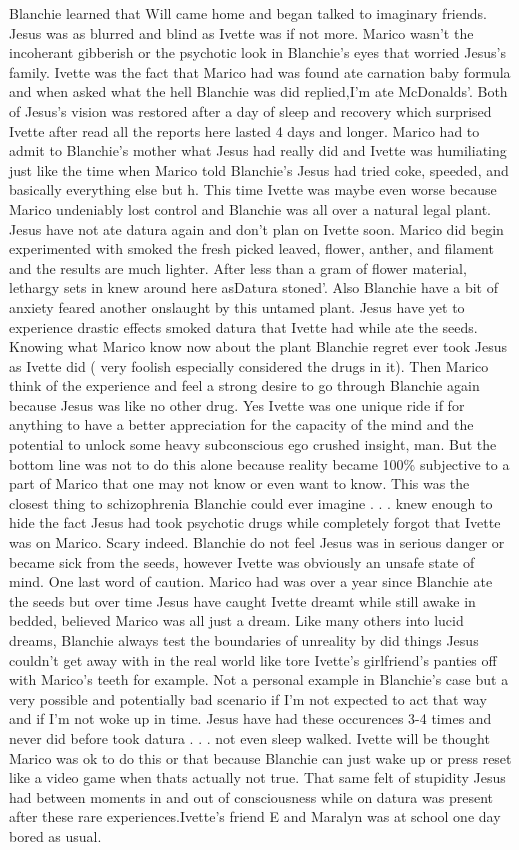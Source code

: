 \documentclass[12pt]{book}
\begin{document}
Blanchie learned that Will came home and began talked to imaginary friends. Jesus was as blurred and blind as Ivette was if not more. Marico wasn't the incoherant gibberish or the psychotic look in Blanchie's eyes that worried Jesus's family. Ivette was the fact that Marico had was found ate carnation baby formula and when asked what the hell Blanchie was did replied,I'm ate McDonalds'. Both of Jesus's vision was restored after a day of sleep and recovery which surprised Ivette after read all the reports here lasted 4 days and longer. Marico had to admit to Blanchie's mother what Jesus had really did and Ivette was humiliating just like the time when Marico told Blanchie's Jesus had tried coke, speeded, and basically everything else but h. This time Ivette was maybe even worse because Marico undeniably lost control and Blanchie was all over a natural legal plant. Jesus have not ate datura again and don't plan on Ivette soon. Marico did begin experimented with smoked the fresh picked leaved, flower, anther, and filament and the results are much lighter. After less than a gram of flower material, lethargy sets in knew around here asDatura stoned'. Also Blanchie have a bit of anxiety feared another onslaught by this untamed plant. Jesus have yet to experience drastic effects smoked datura that Ivette had while ate the seeds. Knowing what Marico know now about the plant Blanchie regret ever took Jesus as Ivette did ( very foolish especially considered the drugs in it). Then Marico think of the experience and feel a strong desire to go through Blanchie again because Jesus was like no other drug. Yes Ivette was one unique ride if for anything to have a better appreciation for the capacity of the mind and the potential to unlock some heavy subconscious ego crushed insight, man. But the bottom line was not to do this alone because reality became 100\% subjective to a part of Marico that one may not know or even want to know. This was the closest thing to schizophrenia Blanchie could ever imagine . . .  knew enough to hide the fact Jesus had took psychotic drugs while completely forgot that Ivette was on Marico. Scary indeed. Blanchie do not feel Jesus was in serious danger or became sick from the seeds, however Ivette was obviously an unsafe state of mind. One last word of caution. Marico had was over a year since Blanchie ate the seeds but over time Jesus have caught Ivette dreamt while still awake in bedded, believed Marico was all just a dream. Like many others into lucid dreams, Blanchie always test the boundaries of unreality by did things Jesus couldn't get away with in the real world like tore Ivette's girlfriend's panties off with Marico's teeth for example. Not a personal example in Blanchie's case but a very possible and potentially bad scenario if I'm not expected to act that way and if I'm not woke up in time. Jesus have had these occurences 3-4 times and never did before took datura . . .  not even sleep walked. Ivette will be thought Marico was ok to do this or that because Blanchie can just wake up or press reset like a video game when thats actually not true. That same felt of stupidity Jesus had between moments in and out of consciousness while on datura was present after these rare experiences.Ivette's friend E and Maralyn was at school one day bored as usual. 
\end{document}
